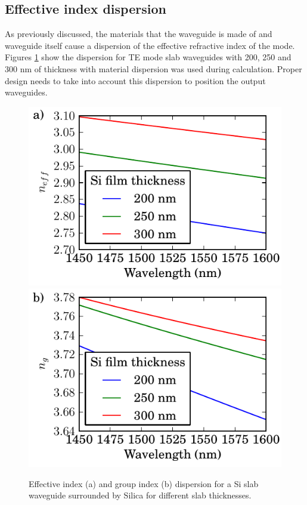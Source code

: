 \documentclass[12pt,twoside,english]{book}
\renewcommand{\~}{\perispomeni}%
\numberwithin{equation}{section}
\numberwithin{figure}{section}
\begin{document}
\subsection{Effective index dispersion} 
As previously discussed, the materials that the waveguide is made of and waveguide itself cause a dispersion of the effective refractive index of the mode. Figures \ref{fig:effective index dispersion} show the dispersion for TE mode slab waveguides with 200, 250 and 300 nm of thickness with material dispersion was used during calculation. Proper design needs to take into account this dispersion to position the output waveguides.
%
\begin{figure}[H]
\includegraphics{graphs/slabDispersion}\includegraphics{graphs/slabGroupDispersion}
\caption{Effective index (a) and group index (b) dispersion for a Si slab waveguide surrounded by Silica for different slab thicknesses.}
\label{fig:effective index dispersion}
\end{figure}
\end{document}
